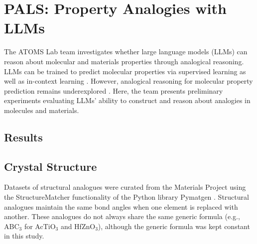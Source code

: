 \section{PALS: Property Analogies with LLMs}



\indent \indent The ATOMS Lab team investigates whether large language models (LLMs) can reason about molecular and materials properties through analogical reasoning. LLMs can be trained to predict molecular properties via supervised learning \cite{jablonka2024leveraging} as well as in-context learning \cite{li2024empowering}. However, analogical reasoning for molecular property prediction remains underexplored \cite{segal2025known}. Here, the team presents preliminary experiments evaluating LLMs’ ability to construct and reason about analogies in molecules and materials.

\vspace{-0.3\baselineskip}
\subsection*{Results}

\subsection*{Crystal Structure}
\indent \indent Datasets of structural analogues were curated from the Materials Project \cite{jain2013commentary} using the StructureMatcher functionality of the Python library Pymatgen \cite{ong2013python}. Structural analogues maintain the same bond angles when one element is replaced with another. These analogues do not always share the same generic formula (e.g., ABC$_3$ for AcTiO$_3$ and HfZnO$_3$), although the generic formula was kept constant in this study.

